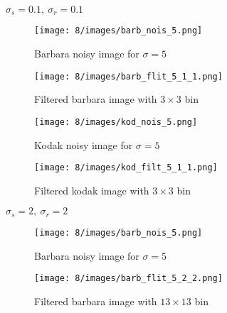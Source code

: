 \documentclass[12pt]{article}
\begin{document}
\begin{itemize}
    $\sigma_s = 0.1, \ \sigma_r = 0.1$
    \begin{figure}[H]
        \centering
        \begin{minipage}{.45\textwidth}
          \centering
          \texttt{[image: 8/images/barb\_nois\_5.png]}
          \caption*{Barbara noisy image for $\sigma = 5$}
          \label{fig:totalpowervst}
        \end{minipage}
        \begin{minipage}{.45\textwidth}
          \centering
          \texttt{[image: 8/images/barb\_flit\_5\_1\_1.png]}
          \caption*{Filtered barbara image with $3\times 3$ bin}
          \label{fig:totalpower2}
        \end{minipage}
        \label{fig:totalPower}
    \end{figure}
    
    \begin{figure}[H]
        \centering
        \begin{minipage}{.45\textwidth}
          \centering
          \texttt{[image: 8/images/kod\_nois\_5.png]}
          \caption*{Kodak noisy image for $\sigma = 5$}
          \label{fig:totalpowervst}
        \end{minipage}
        \begin{minipage}{.45\textwidth}
          \centering
          \texttt{[image: 8/images/kod\_filt\_5\_1\_1.png]}
          \caption*{Filtered kodak image with $3\times 3$ bin}
          \label{fig:totalpower2}
        \end{minipage}
        \label{fig:totalPower}
    \end{figure}
    
    $\sigma_s = 2, \ \sigma_r = 2$
    \begin{figure}[H]
        \centering
        \begin{minipage}{.45\textwidth}
          \centering
          \texttt{[image: 8/images/barb\_nois\_5.png]}
          \caption*{Barbara noisy image for $\sigma = 5$}
          \label{fig:totalpowervst}
        \end{minipage}
        \begin{minipage}{.45\textwidth}
          \centering
          \texttt{[image: 8/images/barb\_flit\_5\_2\_2.png]}
          \caption*{Filtered barbara image with $13\times 13$ bin}
          \label{fig:totalpower2}
        \end{minipage}
        \label{fig:totalPower}
    \end{figure}
    

\end{itemize}
\end{document}
